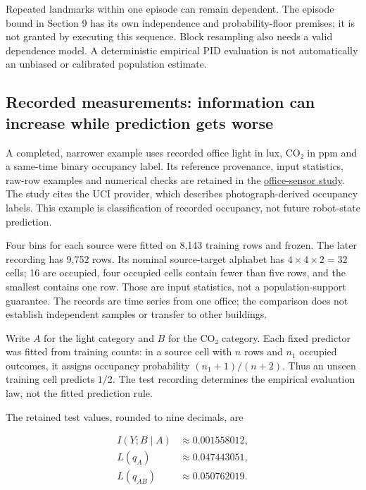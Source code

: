 \documentclass[11pt,a4paper]{article}
\begin{document}
Repeated landmarks within one episode can remain dependent. The episode bound in Section 9 has its own independence and probability-floor premises; it is not granted by executing this sequence. Block resampling also needs a valid dependence model. A deterministic empirical PID evaluation is not automatically an unbiased or calibrated population estimate.

\par{}

\subsection{Recorded measurements: information can increase while prediction gets worse}\label{recorded-measurements-information-can-increase-while-prediction-gets-worse}

A completed, narrower example uses recorded office light in lux, CO₂ in ppm and a same-time binary occupancy label. Its reference provenance, input statistics, raw-row examples and numerical checks are retained in the \href{https://github.com/sepahead/pid-rs/blob/main/audit/evidence/real-occupancy-sensors-example-2026-09-08.md}{office-sensor study}. The study cites the UCI provider, which describes photograph-derived occupancy labels. This example is classification of recorded occupancy, not future robot-state prediction.

Four bins for each source were fitted on 8,143 training rows and frozen. The later recording has 9,752 rows. Its nominal source-target alphabet has \(4\times4\times2=32\) cells; 16 are occupied, four occupied cells contain fewer than five rows, and the smallest contains one row. Those are input statistics, not a population-support guarantee. The records are time series from one office; the comparison does not establish independent samples or transfer to other buildings.

Write \(A\) for the light category and \(B\) for the CO₂ category. Each fixed predictor was fitted from training counts: in a source cell with \(n\) rows and \(n_1\) occupied outcomes, it assigns occupancy probability \((n_1+1)/(n+2)\). Thus an unseen training cell predicts \(1/2\). The test recording determines the empirical evaluation law, not the fitted prediction rule.

The retained test values, rounded to nine decimals, are

\[
\begin{aligned}
I(Y;B\mid A)&\approx0.001558012,\\
L(q_A)&\approx0.047443051,\\
L(q_{AB})&\approx0.050762019.
\end{aligned}
\]
\end{document}

